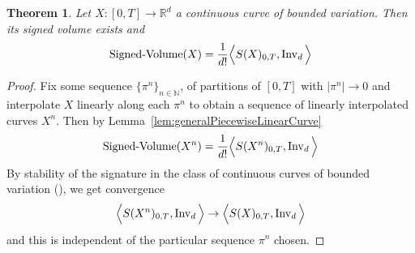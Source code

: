 \documentclass{scrartcl}
\newtheorem{theorem}{Theorem}
\theoremstyle{plain}
\theoremstyle{definition}
\newcommand{\R}{\mathbb{R}}
\newcommand{\N}{\mathbb{N}}
\newcommand{\1}[1]{1_{\{#1\}}}
\newcommand{\ds}{d} %
\begin{document}
\begin{theorem}
	Let $X: [0,T] \to \R^\ds$ a continuous curve of bounded variation.
	Then its signed volume exists and
	\begin{align*}
    \operatorname{Signed-Volume}(X)
    =
    \frac{1}{\ds !}
    \Big\langle S(X)_{0,T}, \firstInvariant{\ds} \Big\rangle
	\end{align*}
\end{theorem}
\begin{proof}
	Fix some sequence $\{\pi^n\}_{n\in\N}$,
  of partitions of $[0,T]$ with $|\pi^n| \to 0$ and interpolate 	$X$ linearly along each $\pi^n$ to obtain a sequence of linearly interpolated curves $X^n$.
	Then by Lemma~\ref{lem:generalPiecewiseLinearCurve}
	\begin{align*}
    \operatorname{Signed-Volume}(X^n)
    =
    \frac{1}{\ds!}
    \Big\langle S(X^n)_{0,T}, \firstInvariant{\ds} \Big\rangle
	\end{align*}
	By stability of the signature in the class of continuous curves of bounded variation (\cite[Proposition 1.28, Proposition 2.7]{bib:FV2010}),
  we get convergence
	\begin{align*}
    \Big\langle S(X^n)_{0,T}, \firstInvariant{\ds} \Big\rangle
    \to
    \Big\langle S(X)_{0,T}, \firstInvariant{\ds} \Big\rangle
	\end{align*}
	and this is independent of the particular sequence $\pi^n$ chosen.
\end{proof}
\end{document}
